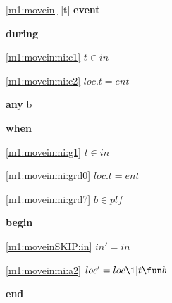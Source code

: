 \noindent \ref{m1:movein} [t] \textbf{event}
\begin{block}
\item \textbf{during}
\begin{block}
\item[ \eqref{m1:moveinmi:c1} ]$t \in in $ %
\item[ \eqref{m1:moveinmi:c2} ]$loc.t = ent $ %
\end{block}
\item \textbf{any} b
\item \textbf{when}
\begin{block}
\item[ \eqref{m1:moveinmi:g1} ]$t \in in $ %
\item[ \eqref{m1:moveinmi:grd0} ]$loc.t = ent $ %
\item[ \eqref{m1:moveinmi:grd7} ]$b \in plf $ %
\end{block}
\item \textbf{begin}
\begin{block}
\item[ \eqref{m1:moveinSKIP:in} ]$in' = in$ %
\item[ \eqref{m1:moveinmi:a2} ]$loc' = loc \1| t \fun b $ %
\end{block}
\item \textbf{end} \\
\end{block}

